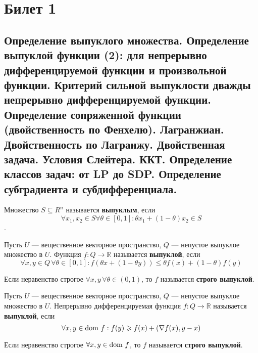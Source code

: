 \section{Билет 1}

\subsection{Определение выпуклого множества. Определение выпуклой функции (2):
    для непрерывно дифференцируемой функции и произвольной функции.
    Критерий сильной выпуклости дважды непрерывно дифференцируемой
    функции. Определение сопряженной функции (двойственность по Фенхелю). Лагранжиан. Двойственность по Лагранжу. Двойственная задача. Условия Слейтера. ККТ. Определение классов задач: от LP до SDP.
    Определение субградиента и субдифференциала.}

\begin{definition}
    Множество $S \subseteq R^n$ называется \textbf{выпуклым}, если
    $$\forall x_1, x_2 \in S \forall \theta \in [0, 1]: \theta x_1 + (1 - \theta)x_2 \in S$$.
\end{definition}

\begin{definition}
    Пусть $U$ --- вещественное векторное пространство, $Q$ --- непустое выпуклое множество в $U$.
    Функция $f: Q \rightarrow \mathbb{R}$ называется \textbf{выпуклой},
    если $$\forall x, y \in Q \, \forall \theta \in [0, 1]: f(\theta x + (1 - \theta y)) \leq \theta f(x) + (1 - \theta) f(y)$$
\end{definition}

\begin{definition}
    Если неравенство строгое $\forall x, y \, \forall \theta \in (0, 1)$, то $f$ называется \textbf{строго выпуклой}.
\end{definition}

\begin{definition}
    Пусть $U$ --- вещественное векторное пространство, $Q$ --- непустое выпуклое множество в $U$.
    Непрерывно дифференцируемая функция $f: Q \rightarrow \mathbb{R}$ называется \textbf{выпуклой},
    если $$\forall x, y \in \operatorname{dom \,} f: f(y) \geqslant f(x) + (\nabla f(x), y - x)$$
\end{definition}

\begin{definition}
    Если неравенство строгое $\forall x, y \in \operatorname{dom \,} f$, то $f$ называется \textbf{строго выпуклой}.
\end{definition}

